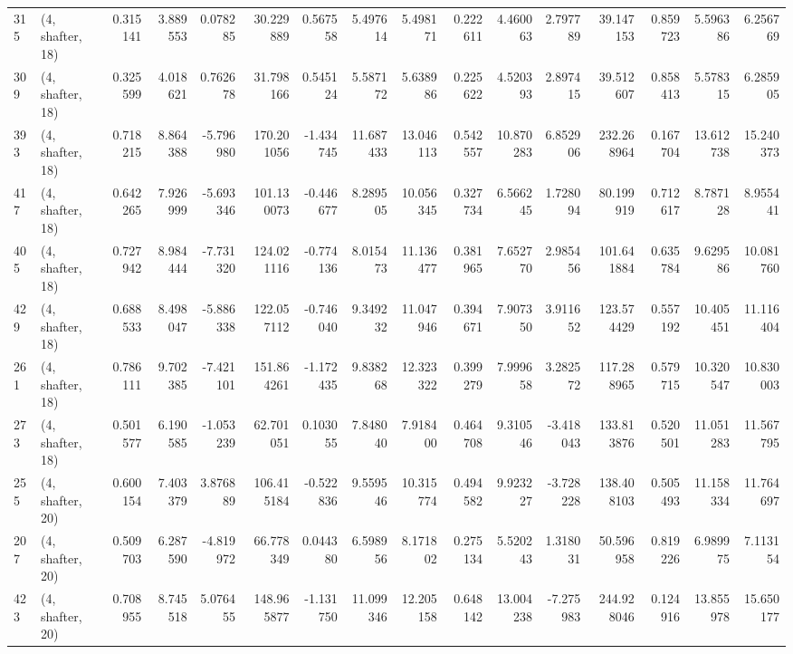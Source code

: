 \begin{tabular}{llrrrrrrrrrrrrrr}
315 &  (4, shafter, 18) &   0.315141 &   3.889553 &   0.078285 &    30.229889 &   0.567558 &   5.497614 &   5.498171 &  0.222611 &   4.460063 &   2.797789 &    39.147153 &  0.859723 &   5.596386 &   6.256769 \\
309 &  (4, shafter, 18) &   0.325599 &   4.018621 &   0.762678 &    31.798166 &   0.545124 &   5.587172 &   5.638986 &  0.225622 &   4.520393 &   2.897415 &    39.512607 &  0.858413 &   5.578315 &   6.285905 \\
393 &  (4, shafter, 18) &   0.718215 &   8.864388 &  -5.796980 &   170.201056 &  -1.434745 &  11.687433 &  13.046113 &  0.542557 &  10.870283 &   6.852906 &   232.268964 &  0.167704 &  13.612738 &  15.240373 \\
417 &  (4, shafter, 18) &   0.642265 &   7.926999 &  -5.693346 &   101.130073 &  -0.446677 &   8.289505 &  10.056345 &  0.327734 &   6.566245 &   1.728094 &    80.199919 &  0.712617 &   8.787128 &   8.955441 \\
405 &  (4, shafter, 18) &   0.727942 &   8.984444 &  -7.731320 &   124.021116 &  -0.774136 &   8.015473 &  11.136477 &  0.381965 &   7.652770 &   2.985456 &   101.641884 &  0.635784 &   9.629586 &  10.081760 \\
429 &  (4, shafter, 18) &   0.688533 &   8.498047 &  -5.886338 &   122.057112 &  -0.746040 &   9.349232 &  11.047946 &  0.394671 &   7.907350 &   3.911652 &   123.574429 &  0.557192 &  10.405451 &  11.116404 \\
261 &  (4, shafter, 18) &   0.786111 &   9.702385 &  -7.421101 &   151.864261 &  -1.172435 &   9.838268 &  12.323322 &  0.399279 &   7.999658 &   3.282572 &   117.288965 &  0.579715 &  10.320547 &  10.830003 \\
273 &  (4, shafter, 18) &   0.501577 &   6.190585 &  -1.053239 &    62.701051 &   0.103055 &   7.848040 &   7.918400 &  0.464708 &   9.310546 &  -3.418043 &   133.813876 &  0.520501 &  11.051283 &  11.567795 \\
255 &  (4, shafter, 20) &   0.600154 &   7.403379 &   3.876889 &   106.415184 &  -0.522836 &   9.559546 &  10.315774 &  0.494582 &   9.923227 &  -3.728228 &   138.408103 &  0.505493 &  11.158334 &  11.764697 \\
207 &  (4, shafter, 20) &   0.509703 &   6.287590 &  -4.819972 &    66.778349 &   0.044380 &   6.598956 &   8.171802 &  0.275134 &   5.520243 &   1.318031 &    50.596958 &  0.819226 &   6.989975 &   7.113154 \\
423 &  (4, shafter, 20) &   0.708955 &   8.745518 &   5.076455 &   148.965877 &  -1.131750 &  11.099346 &  12.205158 &  0.648142 &  13.004238 &  -7.275983 &   244.928046 &  0.124916 &  13.855978 &  15.650177 \\

\end{tabular}
